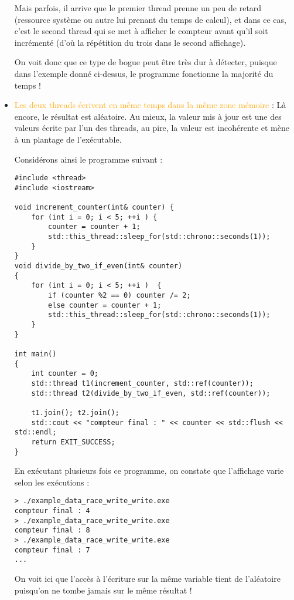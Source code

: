 \documentclass[fleqn,11pt]{article}
\begin{document}
\begin{itemize}
Mais parfois, il arrive que le premier thread prenne un peu de retard (ressource système ou autre lui prenant du temps de calcul), et dans ce cas, c'est le second thread qui se met à afficher le compteur avant qu'il soit
incrémenté (d'où la répétition du trois dans le second affichage).

On voit donc que ce type de bogue peut être très dur à détecter, puisque dans l'exemple donné ci-dessus,
le programme fonctionne la majorité du temps !

\item \textcolor{orange}{Les deux threads écrivent en même temps dans la même zone mémoire} : Là encore, le résultat est aléatoire. Au mieux, la valeur mis à jour est une des valeurs écrite par l'un des threads, au pire, la valeur est incohérente et mène à un plantage de l'exécutable.

Considérons ainsi le programme suivant :
\begin{lstlisting}
#include <thread>
#include <iostream>

void increment_counter(int& counter) {
    for (int i = 0; i < 5; ++i ) {
        counter = counter + 1;
        std::this_thread::sleep_for(std::chrono::seconds(1));
    }
}
void divide_by_two_if_even(int& counter)
{
    for (int i = 0; i < 5; ++i )  {
        if (counter %2 == 0) counter /= 2;
        else counter = counter + 1;
        std::this_thread::sleep_for(std::chrono::seconds(1));
    }
}

int main()
{
    int counter = 0;
    std::thread t1(increment_counter, std::ref(counter));
    std::thread t2(divide_by_two_if_even, std::ref(counter));

    t1.join(); t2.join();
    std::cout << "compteur final : " << counter << std::flush << std::endl;
    return EXIT_SUCCESS;    
}
\end{lstlisting}
En exécutant plusieurs fois ce programme, on constate que l'affichage varie selon les exécutions :
\begin{verbatim}
> ./example_data_race_write_write.exe
compteur final : 4
> ./example_data_race_write_write.exe
compteur final : 8
> ./example_data_race_write_write.exe
compteur final : 7
...
\end{verbatim}

On voit ici que l'accès à l'écriture sur la même variable tient de l'aléatoire puisqu'on ne tombe jamais sur le même résultat !
\end{itemize}
\end{document}
